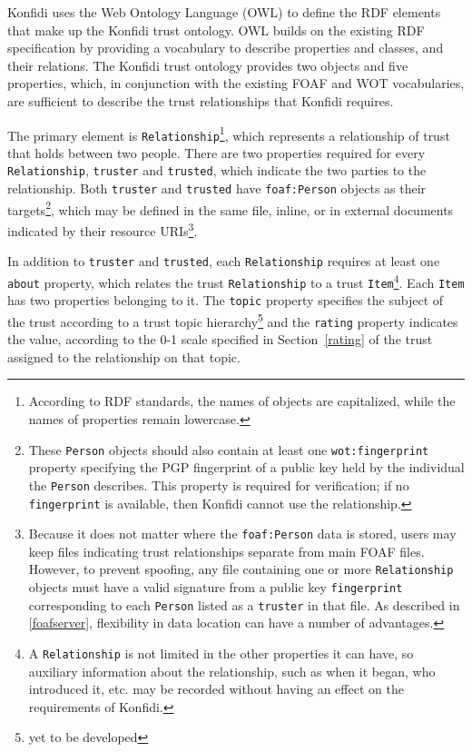 \documentclass[onecolumn]{acm_proc_article-sp}
\begin{document}
Konfidi uses the Web Ontology Language (OWL)\cite{owl} to define the RDF elements that make up the Konfidi trust ontology.  OWL builds on the existing RDF specification by providing a vocabulary to describe properties and classes, and their relations.  The Konfidi trust ontology provides two objects and five properties, which, in conjunction with the existing FOAF and WOT vocabularies, are sufficient to describe the trust relationships that Konfidi requires.


The primary element is \texttt{Relationship}\footnote{According to RDF standards, the names of objects are capitalized, while the names of properties remain lowercase.}, which represents a relationship of trust that holds between two people.  There are two properties required for every \texttt{Relationship}, \texttt{truster} and \texttt{trusted}, which indicate the two parties to the relationship.  Both \texttt{truster} and \texttt{trusted} have \texttt{foaf:Person} objects as their targets\footnote{These \texttt{Person} objects should also contain at least one \texttt{wot:fingerprint} property specifying the PGP fingerprint of a public key held by the individual the \texttt{Person} describes.  This property is required for verification; if no \texttt{fingerprint} is available, then Konfidi cannot use the relationship.}, which may be defined in the same file, inline, or in external documents indicated by their resource URIs\footnote{Because it does not matter where the \texttt{foaf:Person} data is stored, users may keep files indicating trust relationships separate from main FOAF files.  However, to prevent spoofing, any file containing one or more \texttt{Relationship} objects must have a valid signature from a public key \texttt{fingerprint} corresponding to each \texttt{Person} listed as a \texttt{truster} in that file.  As described in \ref{foafserver}, flexibility in data location can have a number of advantages. }.  

In addition to \texttt{truster} and \texttt{trusted}, each \texttt{Relationship} requires at least one \texttt{about} property, which relates the trust \texttt{Relationship} to a trust \texttt{Item}\footnote{A \texttt{Relationship} is not limited in the other properties it can have, so auxiliary information about the relationship, such as when it began, who introduced it, etc. may be recorded without having an effect on the requirements of Konfidi.}.  Each \texttt{Item} has two properties belonging to it.  The \texttt{topic} property specifies the subject of the trust according to a trust topic hierarchy\footnote{yet to be developed} and the \texttt{rating} property indicates the value, according to the 0-1 scale specified in Section~\ref{rating} of the trust assigned to the relationship on that topic.  
\end{document}
